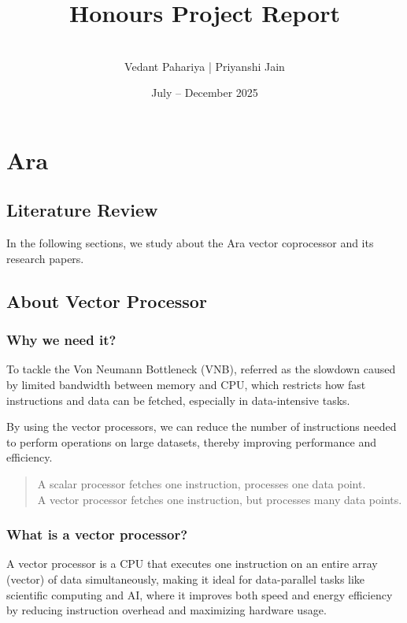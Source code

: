\documentclass[12pt, a4paper]{article}
\title{Honours Project Report}
\author{\\[-5ex] Vedant Pahariya | Priyanshi Jain}
\date{July -- December 2025}
\begin{document}
\maketitle
\tableofcontents
\newpage

\section{Ara}

\subsection{Literature Review}

In the following sections, we study about the Ara vector coprocessor and its research papers.

\subsection{About Vector Processor}

\subsubsection{Why we need it?}

To tackle the Von Neumann Bottleneck (VNB), referred as the slowdown caused by limited bandwidth between memory and CPU, which restricts how fast instructions and data can be fetched, especially in data-intensive tasks.

By using the vector processors, we can reduce the number of instructions needed to perform operations on large datasets, thereby improving performance and efficiency.

\begin{quote}
A scalar processor fetches one instruction, processes one data point.\\
A vector processor fetches one instruction, but processes many data points.
\end{quote}

\subsubsection{What is a vector processor?}

A vector processor is a CPU that executes one instruction on an entire array (vector) of data simultaneously, making it ideal for data-parallel tasks like scientific computing and AI, where it improves both speed and energy efficiency by reducing instruction overhead and maximizing hardware usage.
\end{document}
